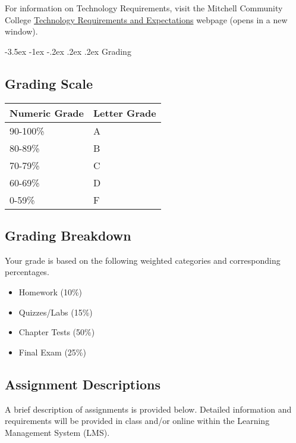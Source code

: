 \documentclass{article}
\makeatletter
\renewcommand\section{\@startsection{section}{1}{0pt}%
  {-3.5ex \@plus -1ex \@minus -.2ex}%
  {.2ex \@plus.2ex}%
  {\normalfont\Large\bfseries}} %
\makeatother
\begin{document}
For information on Technology Requirements, visit the Mitchell Community College \href{https://www.mitchellcc.edu/college-credit-online-classes/\#online-learning}{Technology Requirements and Expectations} webpage (opens in a new window).

\section{Grading}

\subsection{Grading Scale}

\bigskip\noindent
\begin{tabular}{p{}p{}}
\toprule
Numeric Grade & Letter Grade \\
\hline
90-100\% & A \\
80-89\% & B \\
70-79\% & C \\
60-69\% & D \\
0-59\% & F \\
\bottomrule
\end{tabular}

\bigskip\subsection{Grading Breakdown}

Your grade is based on the following weighted categories and corresponding percentages.

\begin{itemize}
\item Homework (10\%)
\item Quizzes/Labs (15\%)
\item Chapter Tests (50\%)
\item Final Exam (25\%)
\end{itemize}

\subsection{Assignment Descriptions}

A brief description of assignments is provided below. Detailed information and requirements will be provided in class and/or online within the Learning Management System (LMS).
\end{document}

